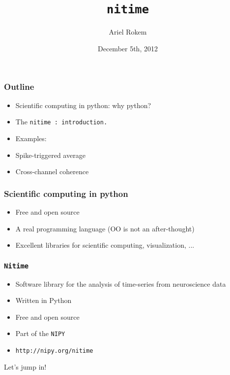 \documentclass{beamer}
\title[nitime]{\tt{nitime}}
\subtitle
{\sc{Time-series analysis with python}}
\author[Ariel Rokem] %
{Ariel Rokem}
\date{December 5th, 2012}
\institute[Stanford University]
{Stanford University}
\begin{document}
\begin{frame}
  \titlepage
\end{frame}

\begin{frame}
\frametitle{Outline}
\begin{itemize}
\pause
\item
Scientific computing in python: why python?
\pause
\item
The \tt{nitime} : introduction.
\pause
\item 
Examples: 
\pause
\item
Spike-triggered average
\pause
\item
Cross-channel coherence
\end{itemize}
\end{frame}

\begin{frame}
\frametitle{Scientific computing in python}
\begin{itemize}
\pause
\item
Free and open source
\pause
\item
A real programming language (OO is not an after-thought)
\pause
\item
Excellent libraries for scientific computing, visualization, ...
\end{itemize}
\end{frame}


\begin{frame}
\frametitle{\tt{Nitime}}
\begin{itemize}
\pause
\item
Software library for the analysis of time-series from neuroscience data
\pause
\item
Written in Python
\pause
\item 
Free and open source
\pause
\item
Part of the \tt{NIPY} 
\pause
\item
\tt{http://nipy.org/nitime}
\end{itemize}
\end{frame}

\begin{frame}
\large{Let's jump in!}
\end{frame}
\end{document}
